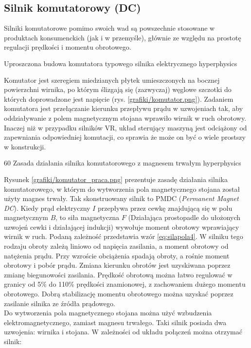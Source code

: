 \subsection{Silnik komutatorowy (DC)}

Silniki komutatorowe pomimo swoich wad są powszechnie stosowane w produktach konsumenckich (jak i w przemyśle), głównie ze względu na prostotę regulacji prędkości i momentu obrotowego.

		{Uproszczona budowa komutatora typowego silnika elektrycznego}
		{hyperphysics}
		
Komutator jest szeregiem miedzianych płytek umieszczonych na bocznej powierzchni wirnika, po którym ślizgają się (zazwyczaj) węglowe szczotki do których doprowadzone jest napięcie (rys. \ref{grafiki/komutator.png}). Zadaniem komutatora jest przełączanie kierunku przepływu prądu w uzwojeniach tak, aby oddziaływanie z polem magnetycznym stojana wprawiło wirnik w ruch obrotowy. Inaczej niż w przypadku silników VR, układ sterujący maszyną jest odciążony od zapewniania odpowiedniej komutacji, co sprawia że może on być o wiele prostszy w konstrukcji. 

		{60}
		{Zasada działania silnika komutatorowego z magnesem trwałym}
		{hyperphysics}
		
Rysunek \ref{grafiki/komutator_praca.png} prezentuje zasadę działania silnika komutatorowego, w którym do wytworzenia pola magnetycznego stojana został użyty magnes trwały. Tak skonstruowany silnik to PMDC ({\it Permanent Magnet DC}). Kiedy prąd elektryczny $ I $ przepływa przez cewkę znajdującą się w polu magnetycznym $ B $, to siła magnetyczna $ F $ (Działająca prostopadle do ułożonych uzwojeń cewki i działającej indukcji)  wywołuje moment obrotowy wprawiający wirnik w ruch. Podaną zależność przedstawia wzór \ref{eq:silapola4}. W silniku tego rodzaju obroty zależą liniowo od napięcia zasilania, a moment obrotowy od natężenia prądu. Przy wzroście obciążenia spadają obroty, a rośnie moment obrotowy i pobór prądu. Zmiana kierunku obrotów jest uzyskiwana poprzez zmianę biegunowości zasilania. Prędkość obrotową można łatwo regulować w granicy od 5\% do 110\% prędkości znamionowej, z zachowaniem dużego momentu obrotowego. Dobrą stabilizację momentu obrotowego można uzyskać poprzez zasilanie silnika ze źródła prądowego. \\

Do wytworzenia pola magnetycznego stojana można użyć wzbudzenia elektromagnetycznego, zamiast magnesu trwałego. Taki silnik posiada dwa uzwojenia: wirnika i stojana. W zależności od układu połączeń można otrzymać silnik:

